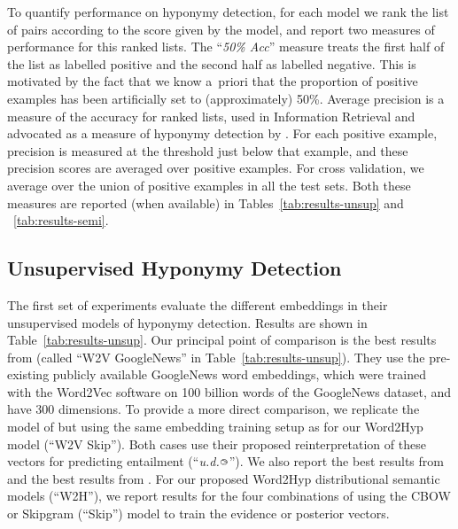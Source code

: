\documentclass[11pt,a4paper]{article}
\newcommand{\bie}{{\raisebox{1.8pt}{\makebox[0pt][l]{\hspace{1.3pt}${\scriptscriptstyle >}$}${\scriptscriptstyle \bigcirc}$}}}
\begin{document}
To quantify performance on hyponymy detection, for each model
we rank the list of pairs according to the score given by the model, and
report two measures of performance for this ranked lists.
The ``{\em 50\% Acc}\/'' measure treats the first half of the list as labelled
positive and the second half as labelled negative.  This is motivated by the
fact that we know a~priori that the proportion of positive examples has been
artificially set to (approximately) 50\%.
Average precision is a measure of the accuracy for ranked lists, used in
Information Retrieval and advocated as a measure of hyponymy detection by
\citet{Vilnis15}.  For each positive example, precision is measured at the
threshold just below that example, and these precision scores are averaged
over positive examples.  For cross validation, we average over the union of
positive examples in all the test sets.  Both these measures are reported
(when available) in Tables~\ref{tab:results-unsup}
and ~\ref{tab:results-semi}.




\subsection{Unsupervised Hyponymy Detection} %
\label{sec:unsuper}

The first set of experiments evaluate the different embeddings in their
unsupervised models of hyponymy detection.  Results are shown in  Table~\ref{tab:results-unsup}.
Our principal point of comparison is the best results from \citep{Henderson16_acl}
(called ``W2V GoogleNews'' in
Table~\ref{tab:results-unsup}).  They use the pre-existing publicly available GoogleNews
word embeddings, which were
trained with the Word2Vec software on 100 billion words of the GoogleNews
dataset, and have 300 dimensions.  To provide a more direct comparison, we
replicate the model of \citet{Henderson16_acl} but using the same embedding
training setup as for our Word2Hyp model (``W2V Skip'').
Both cases use their proposed reinterpretation of these
vectors for predicting entailment (``{\em u.d.}$\bie$'').
We also report the best results from
\citet{weeds2014learning} and the best results from \citep{Shwartz17}.
For our proposed Word2Hyp distributional semantic models (``W2H''), we report results
for the four combinations of using the CBOW or Skipgram (``Skip'') model to train the
evidence or posterior vectors.
\end{document}
